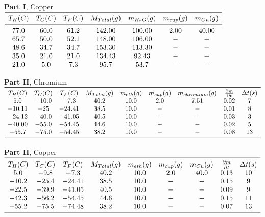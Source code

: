 \documentclass[12pt]{report}
\begin{document}
\begin{center}
\begin{table}[h]
\textbf{Part I}, Copper \\
 $\begin{array}{ *{7}{c} }
\toprule
T_H(C) & T_C(C) & T_F(C) & M_{Total}(g) &  m_{H_2O}(g) & m_{cup}(g) & m_{Cu}(g) \\
\midrule
77.0 & 60.0 & 61.2 & 142.00 & 100.00 & 2.00 & 40.00 \\ 
65.7 & 50.0 & 52.1 &  148.00 & 106.00 & - & - \\ 
48.6 &  34.7 & 34.7 & 153.30 & 113.30 & - & - \\ 
35.0 &  21.0 &  21.0 &  134.43 &  92.43 & - & - \\ 
21.0 & 5.0 &  7.3 &  95.7 & 53.7 & - & - \\ 
 \end{array}$
\end{table}
\begin{table}[h]
\textbf{Part II}, Chromium \\
 $\begin{array}{ *{9}{c} }
\toprule
T_H(C) & T_C(C) & T_F(C) & M_{Total}(g) &  m_{eth}(g) & m_{cup}(g) & m_{chromium}(g)  & \frac{\partial m}{\partial t} & \Delta t(s)\\
5.0 & -10.0 & -7.3 & 40.2 & 10.0 & 2.0 &  7.51 & 0.02 & 7 \\
-10.11 & -25 & -24.41 & 38.5 & 10.0 & - & - & 0.01 & 8 \\
-24.12 & -40.0 & -41.05 & 40.5 & 10.0 & - & - & 0.03 & 3 \\
-40.00 & -55.0 & -54.45 & 44.6 & 10.0 & - & - & 0.02 & 5 \\
-55.7 &  -75.0& -54.45 & 38.2 & 10.0 & - & - & 0.08 & 13 \\
\midrule
\end{array}$
\end{table}
\begin{table}[h]
\textbf{Part II}, Copper \\
 $\begin{array}{ *{9}{c} }
\toprule
T_H(C) & T_C(C) & T_F(C) & M_{Total}(g) &  m_{eth}(g) & m_{cup}(g) & m_{Cu}(g)  & \frac{\partial m}{\partial t} & \Delta t(s)\\
5.0 & -9.8 & -7.3 & 40.2 & 10.0 & 2.0 &  40.0 & 0.13 & 10 \\
-10.2 & -25.4 & -24.41 & 38.5 & 10.0 & - & - & 0.15 & 9 \\
-22.5 & -39.9 & -41.05 & 40.5 & 10.0 & - & - & 0.09 & 9 \\
-42.3 & -56.2 & -54.45 & 44.6 & 10.0 & - & - & 0.15 & 11 \\
-55.2 &  -75.5 & -74.48 & 38.2 & 10.0 & - & - & 0.07 & 13 \\
\midrule
\end{array}$
\end{table}
\end{center}
\end{document}
